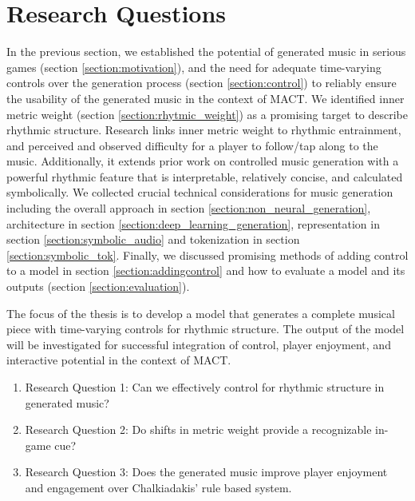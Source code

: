 

\chapter{Research Questions}
\label{chap:researchquestions}
\pagestyle{fancy}

In the previous section, we established the potential of generated music in serious games (section \ref{section:motivation}), and the need for adequate time-varying controls over the generation process (section \ref{section:control}) to reliably ensure the usability of the generated music in the context of MACT. We identified inner metric weight (section \ref{section:rhytmic_weight}) as a promising target to describe rhythmic structure. Research links inner metric weight to rhythmic entrainment, and perceived and observed difficulty for a player to follow/tap along to the music. Additionally, it extends prior work on controlled music generation with a powerful rhythmic feature that is interpretable, relatively concise, and calculated symbolically. 
We collected crucial technical considerations for music generation including the overall approach in section \ref{section:non_neural_generation}, architecture in section \ref{section:deep_learning_generation}, representation in section \ref{section:symbolic_audio} and tokenization in section \ref{section:symbolic_tok}. Finally, we discussed promising methods of adding control to a model in section \ref{section:addingcontrol} and how to evaluate a model and its outputs (section \ref{section:evaluation}). 

The focus of the thesis is to develop a model that generates a complete musical piece with time-varying controls for rhythmic structure. The output of the model will be investigated for successful integration of control, player enjoyment, and interactive potential in the context of MACT. 
  
\begin{enumerate}
\item{Research Question 1}: Can we effectively control for rhythmic structure in generated music?

\item{Research Question 2}: Do shifts in metric weight provide a recognizable in-game cue?

\item {Research Question 3}: Does the generated music improve player enjoyment and engagement over Chalkiadakis' \cite{Chalkiadakis_2022} rule based system. 
\end{enumerate}


